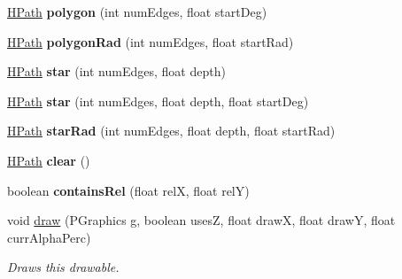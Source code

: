 \begin{DoxyCompactItemize}
\item 
\hypertarget{classhype_1_1extended_1_1drawable_1_1_h_path_ac565819ac90c927bd26c31eacbbcab1c}{\hyperlink{classhype_1_1extended_1_1drawable_1_1_h_path}{H\-Path} {\bfseries polygon} (int num\-Edges, float start\-Deg)}\label{classhype_1_1extended_1_1drawable_1_1_h_path_ac565819ac90c927bd26c31eacbbcab1c}

\item 
\hypertarget{classhype_1_1extended_1_1drawable_1_1_h_path_a442c7539f473b49e0810bc69eac25702}{\hyperlink{classhype_1_1extended_1_1drawable_1_1_h_path}{H\-Path} {\bfseries polygon\-Rad} (int num\-Edges, float start\-Rad)}\label{classhype_1_1extended_1_1drawable_1_1_h_path_a442c7539f473b49e0810bc69eac25702}

\item 
\hypertarget{classhype_1_1extended_1_1drawable_1_1_h_path_ace3920503b9d938f880f7af1bc351d26}{\hyperlink{classhype_1_1extended_1_1drawable_1_1_h_path}{H\-Path} {\bfseries star} (int num\-Edges, float depth)}\label{classhype_1_1extended_1_1drawable_1_1_h_path_ace3920503b9d938f880f7af1bc351d26}

\item 
\hypertarget{classhype_1_1extended_1_1drawable_1_1_h_path_a082778a229d3f45e693543dccfe19992}{\hyperlink{classhype_1_1extended_1_1drawable_1_1_h_path}{H\-Path} {\bfseries star} (int num\-Edges, float depth, float start\-Deg)}\label{classhype_1_1extended_1_1drawable_1_1_h_path_a082778a229d3f45e693543dccfe19992}

\item 
\hypertarget{classhype_1_1extended_1_1drawable_1_1_h_path_a31b900ceb515728436ebe504ebbbeda1}{\hyperlink{classhype_1_1extended_1_1drawable_1_1_h_path}{H\-Path} {\bfseries star\-Rad} (int num\-Edges, float depth, float start\-Rad)}\label{classhype_1_1extended_1_1drawable_1_1_h_path_a31b900ceb515728436ebe504ebbbeda1}

\item 
\hypertarget{classhype_1_1extended_1_1drawable_1_1_h_path_a8f52b87a42368d367463cbcf5a62b0f2}{\hyperlink{classhype_1_1extended_1_1drawable_1_1_h_path}{H\-Path} {\bfseries clear} ()}\label{classhype_1_1extended_1_1drawable_1_1_h_path_a8f52b87a42368d367463cbcf5a62b0f2}

\item 
\hypertarget{classhype_1_1extended_1_1drawable_1_1_h_path_ac8f128faad7c12a1a9b0878b9ce503d6}{boolean {\bfseries contains\-Rel} (float rel\-X, float rel\-Y)}\label{classhype_1_1extended_1_1drawable_1_1_h_path_ac8f128faad7c12a1a9b0878b9ce503d6}

\item 
void \hyperlink{classhype_1_1extended_1_1drawable_1_1_h_path_ad3f269311556453b55e4e6ce92ecbcd2}{draw} (P\-Graphics g, boolean uses\-Z, float draw\-X, float draw\-Y, float curr\-Alpha\-Perc)
\begin{DoxyCompactList}\small\item\em Draws this drawable. \end{DoxyCompactList}\end{DoxyCompactItemize}
